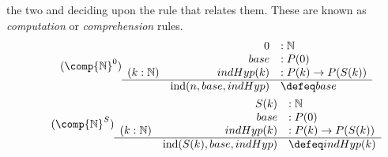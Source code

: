 the two and deciding upon the rule that relates them.
These are known as \emph{computation} or \emph{comprehension}
rules.
\begin{gather}
\tag{$\comp{\mathbb{N}}^0$}
    \begin{array}{crl}
        & 0 & :\mathbb{N}\\
        & base & : P(0)\\
    (k:\mathbb{N})    & indHyp(k) &: P(k)\to P(S(k))\\
    \hline 
        & \text{ind}(n,base,indHyp) & \defeq base
    \end{array}\\
\tag{$\comp{\mathbb{N}}^{S}$}
    \begin{array}{crl}
        & S(k) & :\mathbb{N}\\        
        & base & : P(0)\\
    (k:\mathbb{N})    & indHyp(k) &: P(k)\to P(S(k))\\
    \hline 
        & \text{ind}(S(k),base,indHyp) & \defeq  indHyp(k)
    \end{array}
\end{gather}
